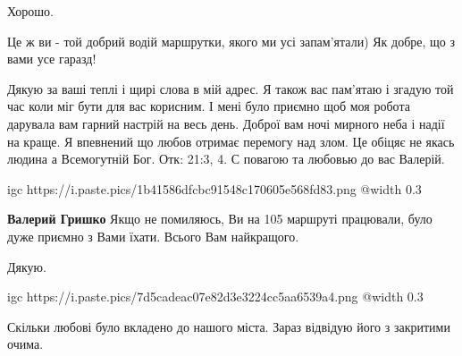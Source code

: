 Хорошо.


Це ж ви - той добрий водій маршрутки, якого ми усі запам'ятали) Як добре, що з вами усе гаразд!

\begin{itemize} %

Дякую за ваші теплі і щирі слова в мій адрес. Я також вас пам'ятаю і згадую той
час коли міг бути для вас корисним. І мені було приємно щоб моя робота
дарувала вам гарний настрій на весь день. Доброї вам ночі мирного неба і надії
на краще. Я впевнений що любов отримає перемогу над злом. Це обіцяє не якась
людина а Всемогутній Бог. Отк: 21:3, 4. С повагою та любовью до вас Валерій.

\ifcmt
  igc https://i.paste.pics/1b41586dfcbc91548c170605e568fd83.png
  @width 0.3
\fi

\textbf{Валерий Гришко} Якщо не помиляюсь, Ви на 105 маршруті працювали, було дуже приємно з Вами їхати. Всього Вам найкращого.


Дякую.

\ifcmt
  igc https://i.paste.pics/7d5cadeac07e82d3e3224cc5aa6539a4.png
  @width 0.3
\fi

\end{itemize} %


Скільки любові було вкладено до нашого міста. Зараз відвідую його з закритими очима.
